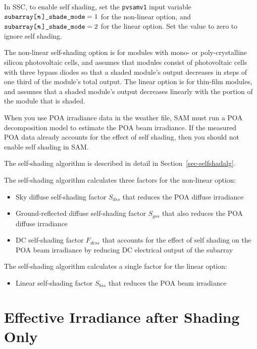 \documentclass[12pt,letterpaper]{article}
\begin{document}
In SSC, to enable self shading, set the \texttt{pvsamv1} input variable $\texttt{subarray[\textit{n}]\_shade\_mode}=1$ for the non-linear option, and $\texttt{subarray[\textit{n}]\_shade\_mode}=2$ for the linear option. Set the value to zero to ignore self shading.

The non-linear self-shading option is for modules with mono- or poly-crystalline silicon photovoltaic cells, and assumes that modules consist of photovoltaic cells with three bypass diodes so that a shaded module's output decreases in steps of one third of the module's total output. The linear option is for thin-film modules, and assumes that a shaded module's output decreases linearly with the portion of the module that is shaded. 

When you use POA irradiance data in the weather file, SAM must run a POA decomposition model to estimate the POA beam irradiance. If the measured POA data already accounts for the effect of self shading, then you should not enable self shading in SAM.

The self-shading algorithm is described in detail in Section~\ref{sec-selfshadalg}.

The self-shading algorithm calculates three factors for the non-linear option:
\begin{itemize}
\item Sky diffuse self-shading factor $S_{dss}$ that reduces the POA diffuse irradiance
\item Ground-reflected diffuse self-shading factor $S_{gss}$ that also reduces the POA  diffuse irradiance
\item DC self-shading factor $F_{dcss}$ that accounts for the effect of self shading on the POA beam irradiance by reducing DC electrical output of the subarray
\end{itemize}

The self-shading algorithm calculates a single factor for the linear option:
\begin{itemize}
\item Linear self-shading factor $S_{bss}$ that reduces the POA beam irradiance
\end{itemize}

\section{Effective Irradiance after Shading Only}
\end{document}
